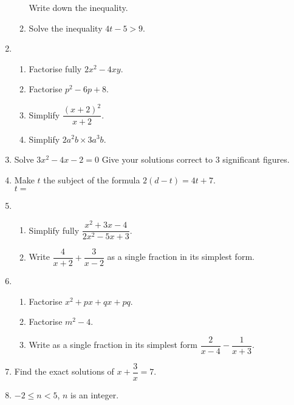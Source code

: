 \begin{enumerate}
\begin{enumerate}
\begin{figure}[H]
    \end{figure}
    Write down the inequality.\strch
    \item Solve the inequality $4t - 5 > 9$.\strch
  \end{enumerate}
  \item %
  \begin{enumerate}
    \item Factorise fully $2x^2 - 4xy$.\strch
    \item Factorise $p^2 - 6p + 8$.\strch
    \item Simplify $\dfrac{(x+2)^2}{x+2}$.\strch
    \item Simplify $2a^2b \times 3a^3b$.\strch
  \end{enumerate}
  \newpage
  \item Solve $3x^2 - 4x - 2 = 0$ Give your solutions correct to 3 significant figures.\strch
  \item Make $t$ the subject of the formula $2(d - t) = 4t + 7$.\strch\\
  \vspace*{0pt}\hfill$t =\ $\dline
  \item %
  \begin{enumerate}
    \item Simplify fully $\dfrac{x^2 + 3x - 4}{2x^2 - 5x + 3}$.\strch
    \item Write $\dfrac{4}{x + 2} + \dfrac{3}{x - 2}$ as a single fraction in its simplest form.\strch
  \end{enumerate}
  \item %
  \begin{enumerate}
    \item Factorise $x^2 + px + qx + pq$.\strch
    \item Factorise $m^2 - 4$.\strch
    \item Write as a single fraction in its simplest form $\dfrac{2}{x - 4} - \dfrac{1}{x + 3}$.\strch
  \end{enumerate}
  \newpage
  \item Find the exact solutions of $x + \dfrac{3}{x} = 7$.\strch
  \item 	$-2 \leq n < 5$, $n$ is an integer.

\end{enumerate}
